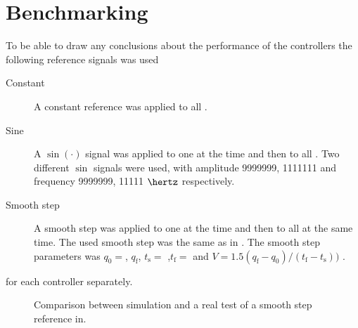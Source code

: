 \section{Benchmarking}
To be able to draw any conclusions about the performance of the controllers the following reference signals was used
\begin{description}
\item[Constant] A constant reference was applied to all \abbrDOF.
\item[Sine] A $\sin(\cdot)$ signal  was applied to one \abbrDOF at the time and then to all \abbrDOF. Two different $\sin$ signals were used, with amplitude {\color{red} 9999999, 1111111} and frequency {\color{red} 9999999, 11111} $\hertz$ respectively. 
\item[Smooth step] A smooth step was applied to one \abbrDOF at the time and then to all \abbrDOF at the same time. The used smooth step was the same as in \citet[p. 192-195]{robotics}. The smooth step parameters was $q_{\text{0}} = $, $q_{\text{f}}$, $t_{\text{s}} = $ ,$t_{\text{f}} = $ and $V = 1.5 (q_{\text{f}} - q_{\text{0}})/(t_{\text{f}} - t_{\text{s}}))$ .  
\end{description}
for each controller separately.
\begin{figure}[tbp]
  \centering
  \qquad
  \qquad
  \qquad
  \qquad
  \qquad
    \qquad
  \qquad
  \caption{\label{fig:StepAttitude}%
    Comparison between simulation and a real test of a smooth step reference in.}
\end{figure}



